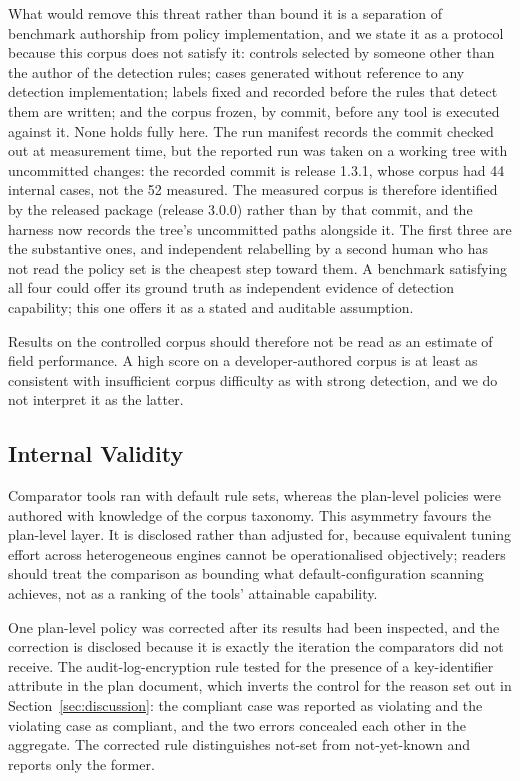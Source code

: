 \documentclass[smallextended]{svjour3}
\begin{document}
What would remove this threat rather than bound it is a separation of benchmark
authorship from policy implementation, and we state it as a protocol because this
corpus does not satisfy it: controls selected by someone other than the author of
the detection rules; cases generated without reference to any detection
implementation; labels fixed and recorded before the rules that detect them are
written; and the corpus frozen, by commit, before any tool is executed against it.
None holds fully here. The run manifest records the commit checked out at
measurement time, but the reported run was taken on a working tree with
uncommitted changes: the recorded commit is release 1.3.1, whose corpus had 44
internal cases, not the 52 measured. The measured corpus is therefore identified
by the released package (release 3.0.0) rather than by that commit, and the harness now records
the tree's uncommitted paths alongside it. The first three are the substantive
ones, and independent relabelling by a second human who has not read
the policy set is the cheapest step toward them. A benchmark satisfying all four
could offer its ground truth as independent evidence of detection capability;
this one offers it as a stated and auditable assumption.

Results on the controlled corpus should therefore not be read as an estimate of
field performance. A high score on a developer-authored corpus is at least as
consistent with insufficient corpus difficulty as with strong detection, and we
do not interpret it as the latter.

\subsection{Internal Validity}
\label{sec:internal}
Comparator tools ran with default rule sets, whereas the plan-level policies were
authored with knowledge of the corpus taxonomy. This asymmetry favours the
plan-level layer. It is disclosed rather than adjusted for, because equivalent
tuning effort across heterogeneous engines cannot be operationalised objectively;
readers should treat the comparison as bounding what default-configuration
scanning achieves, not as a ranking of the tools' attainable capability.

One plan-level policy was corrected after its results had been inspected, and the
correction is disclosed because it is exactly the iteration the comparators did
not receive. The audit-log-encryption rule tested for the presence of a
key-identifier attribute in the plan document, which inverts the control for the
reason set out in Section~\ref{sec:discussion}: the compliant case was reported as
violating and the violating case as compliant, and the two errors concealed each
other in the aggregate. The corrected rule distinguishes not-set from
not-yet-known and reports only the former.
\end{document}
